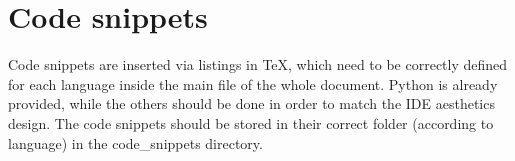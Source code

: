 \newpage
\section{Code snippets}
\label{sec:code}

Code snippets are inserted via listings in \TeX, which need to be correctly defined for each language inside the main file of the whole document. Python is already provided, while the others should be done in order to match the IDE aesthetics design. The code snippets should be stored in their correct folder (according to language) in the code\_snippets directory.

\vspace{1cm}
